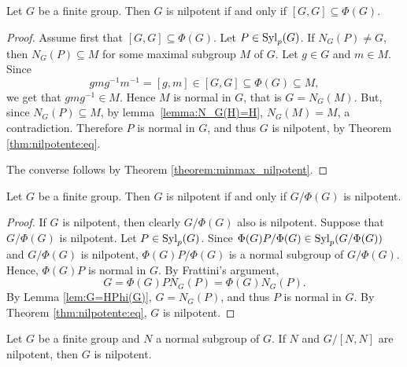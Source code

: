 \begin{theorem}[Wielandt]
	\label{theorem:Wielandt}
	Let $G$ be a finite group. Then $G$ is nilpotent if and only if
	$[G,G]\subseteq\Phi(G)$.
\end{theorem}

\begin{proof}
	Assume first that $[G,G]\subseteq\Phi(G)$. Let $P\in\mathrm{Syl}_p(G)$. If $N_G(P)\ne
	G$, then $N_G(P)\subseteq M$ for some maximal subgroup $M$ of $G$. Let
	$g\in G$ and $m\in M$. Since 
	\[
		gmg^{-1}m^{-1}=[g,m]\in [G,G]\subseteq\Phi(G)\subseteq M,
	\]
	we get that $gmg^{-1}\in M$. Hence $M$ is normal in $G$, that is $G=N_G(M)$. But, since $N_G(P)\subseteq M$, by
	lemma~\ref{lemma:N_G(H)=H}, $N_G(M)=M$, a contradiction. Therefore $P$ is normal in $G$, and thus $G$ is nilpotent, by Theorem \ref{thm:nilpotente:eq}.
	
	The converse follows by Theorem \ref{theorem:minmax_nilpotent}.
\end{proof}

\begin{theorem}
	\label{theorem:G/phi(G)}
	Let $G$ be a finite group. Then $G$ is nilpotent if and only if	$G/\Phi(G)$ is nilpotent.
\end{theorem}

\begin{proof}
	If $G$ is nilpotent, then clearly $G/\Phi(G)$ also is nilpotent. Suppose that $G/\Phi(G)$ is
	nilpotent. Let $P\in\mathrm{Syl}_p(G)$. Since
	$\Phi(G)P/\Phi(G)\in\mathrm{Syl}_p(G/\Phi(G))$ and $G/\Phi(G)$ is nilpotent,
	$\Phi(G)P/\Phi(G)$ is a normal subgroup of $G/\Phi(G)$. Hence,  $\Phi(G)P$ is  normal in $G$.
	By Frattini's argument,  
	\[
		G=\Phi(G)PN_G(P)=\Phi(G)N_G(P).
	\]
	By Lemma \ref{lem:G=HPhi(G)},  $G=N_G(P)$, and thus $P$ is normal in $G$. By Theorem \ref{thm:nilpotente:eq}, $G$ is nilpotent.
\end{proof}

\begin{theorem}[Hall]
	\label{theorem:Hall_nilpotente}
	Let $G$ be a finite group and $N$ a normal subgroup of $G$. If $N$ and
	$G/[N,N]$ are nilpotent, then $G$ is nilpotent.
\end{theorem}

